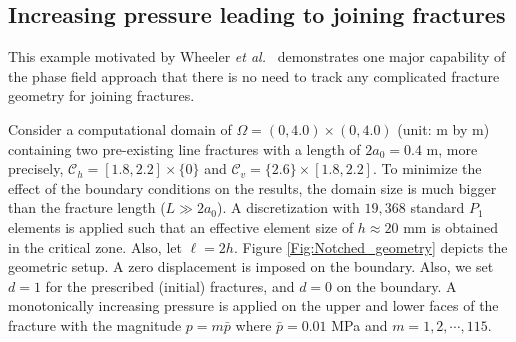 %
%

\subsection{{Increasing pressure leading to joining fractures}}
{This example motivated by Wheeler \emph{et al.}~\cite{Wheeler201469} demonstrates one major capability of the phase field approach that there is no need to track any complicated fracture geometry for joining fractures.}

{Consider a computational domain of $\Omega=(0,4.0)\times(0,4.0)$ (unit: m by m) containing two pre-existing %
	line fractures with a length of $2a_0=0.4$ m, more precisely, $\mathcal{C}_h=[1.8, 2.2]\times\{0\}$ and $\mathcal{C}_v=\{2.6\}\times[1.8, 2.2]$. To minimize the effect of the boundary conditions on the results, the domain size is much bigger than the fracture length ($L\gg 2a_0$). A discretization with $19,368$ standard $P_1$ elements is applied such that an effective element size of $h\approx 20$ mm is obtained in the critical zone. Also, let $\ell=2h$. Figure \ref{Fig:Notched_geometry} depicts the geometric setup. A zero displacement is imposed on the boundary. Also, we set $d=1$ for the prescribed (initial) fractures, and $d=0$ on the boundary. A monotonically increasing pressure is applied on the upper and lower faces of the fracture with the magnitude $p=m\bar{p}$ where $\bar{p}=0.01$ MPa and $m=1, 2, \cdots, 115$.}

